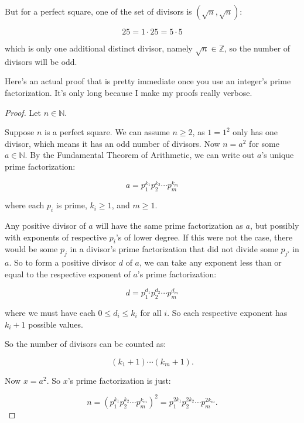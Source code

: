 \documentclass{article}
\theoremstyle{definition}
\begin{document}
But for a perfect square, one of the set of divisors is $(\sqrt{n}, \sqrt{n})$:

\begin{equation*}
25 = 1 \cdot 25 = 5 \cdot 5
\end{equation*}

which is only one additional distinct divisor, namely $\sqrt{n} \in \mathbb{Z}$, so the number of divisors will be odd.

Here's an actual proof that is pretty immediate once you use an integer's prime factorization. It's only long because I make my proofs really verbose.

\begin{proof}
Let $n \in \mathbb{N}$. 

Suppose $n$ is a perfect square. We can assume $n \geq 2$, as $1 = 1^2$ only has one divisor, which means it has an odd number of divisors. Now $n = a^2$ for some $a \in \mathbb{N}$. By the Fundamental Theorem of Arithmetic, we can write out $a$'s unique prime factorization:

\begin{equation*}
a = p_1^{k_1} p_2^{k_2} \cdots p_m^{k_m}
\end{equation*}

where each $p_i$ is prime, $k_i \geq 1$, and $m \geq 1$.

Any positive divisor of $a$ will have the same prime factorization as $a$, but possibly with exponents of respective $p_i$'s of lower degree. If this were not the case, there would be some $p_j$ in a divisor's prime factorization that did not divide some $p_{j'}$ in $a$. So to form a positive divisor $d$ of $a$, we can take any exponent less than or equal to the respective exponent of $a$'s prime factorization:

\begin{equation*}
d = p_1^{d_1} p_2^{d_2} \cdots p_m^{d_m}
\end{equation*}

where we must have each $0 \leq d_i \leq k_i$ for all $i$. So each respective exponent has $k_i + 1$ possible values.

So the number of divisors can be counted as:

\begin{equation*}
(k_1 + 1) \cdots (k_m + 1).
\end{equation*}

Now $x = a^2$. So $x$'s prime factorization is just:

\begin{equation*}
n = \left(p_1^{k_1} p_2^{k_2} \cdots p_m^{k_m}\right)^2 = p_1^{2k_1} p_2^{2k_2} \cdots p_m^{2k_m}.
\end{equation*}


\end{proof}
\end{document}
